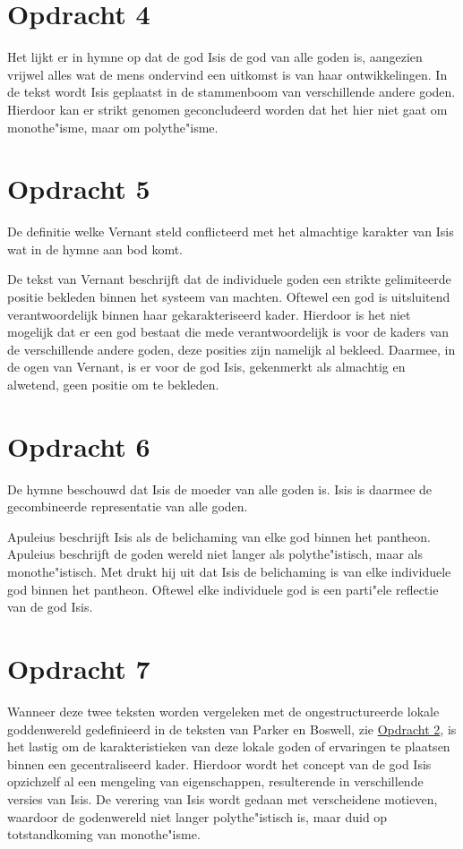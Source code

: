 \documentclass[10pt]{amsart}
\begin{document}
\section*{Opdracht 4}
Het lijkt er in hymne op dat de god Isis de god van alle goden is, aangezien vrijwel alles wat de mens ondervind een uitkomst is van haar ontwikkelingen.
In de tekst wordt Isis geplaatst in de stammenboom van verschillende andere goden. Hierdoor kan er strikt genomen geconcludeerd worden dat het hier niet gaat om monothe"isme, maar om polythe"isme.

\section*{Opdracht 5}
De definitie welke Vernant\autocite{vernantGreceAncienneEtude1976} steld conflicteerd met het almachtige karakter van Isis wat in de hymne\autocite{i.AretologieVanIsis} aan bod komt.

De tekst van Vernant beschrijft dat de individuele goden een strikte gelimiteerde positie bekleden binnen het systeem
van machten. Oftewel een god is uitsluitend verantwoordelijk binnen haar gekarakteriseerd kader. Hierdoor is het niet
mogelijk dat er een god bestaat die mede verantwoordelijk is voor de kaders van de verschillende andere goden, deze
posities zijn namelijk al bekleed. Daarmee, in de ogen van Vernant, is er voor de god Isis, gekenmerkt als almachtig en
alwetend, geen positie om te bekleden.

\section*{Opdracht 6}

De hymne\autocite{vanderlipHymneVoorIsis1972} beschouwd dat Isis de moeder van alle goden is. Isis is daarmee de
gecombineerde representatie van alle goden.

Apuleius\autocite{apuleiusMetamorphosesa} beschrijft Isis als de belichaming van elke god binnen het pantheon. Apuleius
beschrijft de goden wereld niet langer als polythe"istisch, maar als monothe"istisch. Met  drukt hij uit dat Isis de belichaming is van elke individuele god binnen het pantheon.
Oftewel elke individuele god is een parti"ele reflectie van de god Isis.

\section*{Opdracht 7}
Wanneer deze twee teksten worden vergeleken met de ongestructureerde lokale goddenwereld gedefinieerd in de teksten van Parker en Boswell, zie \hyperref[opdracht2]{Opdracht 2}, is het lastig om de karakteristieken van deze lokale goden of ervaringen te plaatsen binnen een gecentraliseerd kader. Hierdoor wordt het concept van de god Isis opzichzelf al een mengeling van eigenschappen, resulterende in verschillende versies van Isis. De verering van Isis wordt gedaan met verscheidene motieven, waardoor de godenwereld niet langer polythe"istisch is, maar duid op totstandkoming van monothe"isme.
\end{document}
